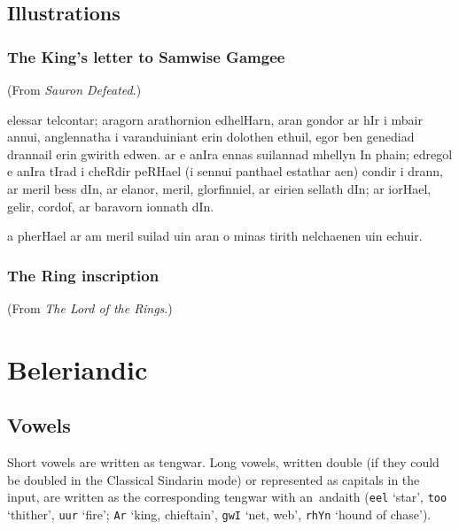 \documentclass{article}
\newif \ifcmteng \cmtengtrue
\newcommand\book[1]{{\sl#1}\/}
\newcommand\quet[1]{%
  \ifcmteng \underline {\quetta{#1}}\else \quetta{#1}\fi}
\newcommand\queng[1]{{\tt#1} \quet{#1}}
\begin{document}
\subsection{Illustrations}

\subsubsection{The King's letter to Samwise Gamgee}

(From \book{Sauron Defeated}.)

\medskip\begin{elvish}
  elessar telcontar; aragorn arathornion edhelHarn, aran gondor ar
  hIr i mbair annui, anglennatha i varanduiniant erin dolothen ethuil,
  egor ben genediad drannail erin gwirith edwen. ar e anIra ennas
  suilannad mhellyn In phain; edregol e anIra tIrad i cheRdir
  peRHael (i sennui pant{}hael estathar aen) condir i drann, ar
  meril bess dIn, ar elanor, meril, glorfinniel, ar eirien sellath
  dIn; ar iorHael, gelir, cordof, ar baravorn ionnath dIn.

  a pherHael ar am meril suilad uin aran o minas tirith nelchaenen
  uin echuir.
\end{elvish}

\subsubsection{The Ring inscription}\oleft \vaswestron

(From \book{The Lord of the Rings}.)

\medskip
{} 

 

\section{Beleriandic}\beleriand

\subsection{Vowels}

Short vowels are written as tengwar. Long vowels, written double (if
they could be doubled in the Classical Sindarin mode) or represented
as capitals in the input, are written as the corresponding tengwar
with an~andaith (\queng{eel} `star', \queng{too} `thither',
\queng{uur} `fire'; \queng{Ar} `king, chieftain', \queng{gwI} `net,
web', \queng{rhYn} `hound of chase').
\end{document}
